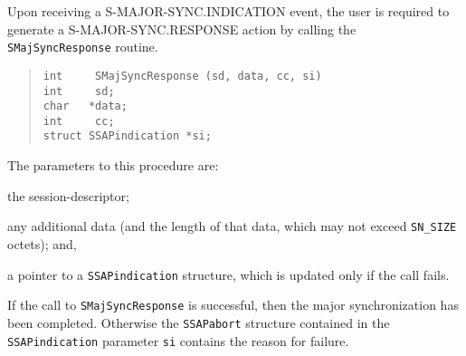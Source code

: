 Upon receiving a {\sf S-MAJOR-SYNC.INDICATION\/} event,
the user is required to generate a {\sf S-MAJOR-SYNC.RESPONSE\/} action
by calling the \verb"SMajSyncResponse" routine.
\begin{quote}\small\begin{verbatim}
int     SMajSyncResponse (sd, data, cc, si)
int     sd;
char   *data;
int     cc;
struct SSAPindication *si;
\end{verbatim}\end{quote}
The parameters to this procedure are:
\begin{describe}
\item[\verb"sd":] the session-descriptor;

\item[\verb"data"/\verb"cc":] any additional data
(and the length of that data, which may not exceed \verb"SN_SIZE" octets);
and,

\item[\verb"si":] a pointer to a \verb"SSAPindication" structure, which is
updated only if the call fails.
\end{describe}
If the call to \verb"SMajSyncResponse" is successful,
then the major synchronization has been completed.
Otherwise the \verb"SSAPabort" structure contained in
the \verb"SSAPindication" parameter
\verb"si" contains the reason for failure.

